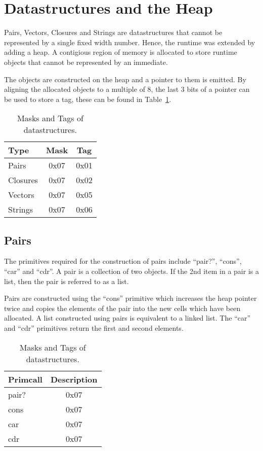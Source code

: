 \documentclass{article}
\begin{document}
\section{Datastructures and the Heap}

Pairs, Vectors, Closures and Strings are datastructures that cannot be represented by a single fixed width number. Hence, the runtime was extended by adding a heap. A contigious region of memory is allocated to store runtime objects that cannot be represented by an immediate.

The objects are constructed on the heap and a pointer to them is emitted. By aligning the allocated objects to a multiple of 8, the last 3 bits of a pointer can be used to store a tag, these can be found in Table~\ref{tab:datastructures}.

\begin{table}[ht]
  \centering
\begin{tabular}{ l c c }
  \toprule
  Type & Mask & Tag  \\ \hline
  \midrule
  Pairs  & 0x07 & 0x01 \\
  Closures & 0x07 & 0x02 \\
  Vectors & 0x07 & 0x05 \\
  Strings & 0x07 & 0x06 \\
  \bottomrule
\end{tabular}
\caption{Masks and Tags of datastructures.} \label{tab:datastructures}
\end{table}

\subsection{Pairs}

The primitives required for the construction of pairs include ``pair?'', ``cons'', ``car'' and ``cdr''. A pair is a collection of two objects. If the 2nd item in a pair is a list, then the pair is referred to as a list.

Pairs are constructed using the ``cons'' primitive which increases the heap pointer twice and copies the elements of the pair into the new cells which have been allocated. A list constructed using pairs is equivalent to a linked list. The ``car'' and ``cdr'' primitives return the first and second elements.

\begin{table}[ht]
  \centering
\begin{tabular}{ l c }
  \toprule
  Primcall & Description \\ \hline
  \midrule
  pair? & 0x07 \\
  cons & 0x07 \\
  car & 0x07 \\
  cdr & 0x07 \\
  \bottomrule
\end{tabular}
\caption{Masks and Tags of datastructures.} \label{tab:primcalls}
\end{table}
\end{document}
